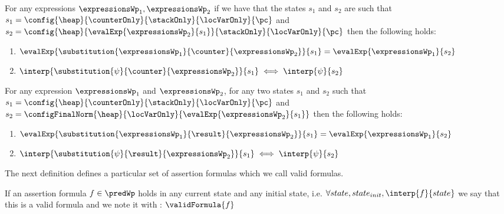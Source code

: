 \begin{substCntr}\label{substCntr}
For any expressions $ \expressionsWp_1, \expressionsWp_2 $ 
if we have that the states $s_1$ and $s_2$ are such that
 $s_1 =   \config{\heap}{\counterOnly}{ \stackOnly }{\locVarOnly}{\pc }$ and 
$s_2 =  \config{\heap}{\evalExp{ \expressionsWp_2}{ s_1  } }{ \stackOnly }{\locVarOnly}{\pc }  $ then 
the following holds:
\begin{enumerate}
      \item $\evalExp{\substitution{\expressionsWp_1}{ \counter }{ \expressionsWp_2 }}{ s_1 } = \evalExp{\expressionsWp_1}{s_2} $
      \item $\interp{\substitution{\psi}{ \counter }{ \expressionsWp_2 }}{ s_1 } \iff \interp{\psi}{s_2} $
\end{enumerate}
\end{substCntr} 




\begin{substRet}\label{substRet} 
For any expression $\expressionsWp_1$ and $\expressionsWp_2$,
for any two states $s_1$ and $s_2$  such that
$ s_1 =   \config{\heap}{\counterOnly}{ \stackOnly }{\locVarOnly}{\pc }$ and \\
$ s_2 =   \configFinalNorm{\heap}{\locVarOnly}{\evalExp{\expressionsWp_2}{s_1} } $ then 
the following holds:
\begin{enumerate}
      \item $\evalExp{\substitution{\expressionsWp_1}{ \result }{ \expressionsWp_2 }}{ s_1 } = \evalExp{\expressionsWp_1}{s_2} $
      \item $\interp{\substitution{\psi}{ \result}{ \expressionsWp_2 }}{ s_1 } \iff \interp{\psi}{s_2} $
\end{enumerate}
\end{substRet}


The next definition defines a particular set of assertion formulas which we call valid formulas.
\begin{valid}
  If an assertion formula  $ f \in \predWp $ holds in any current state and any initial state, i.e.
$\forall state, state_{init}, \interp{f}{state} $ we say that this is a valid formula and we note it with :
  $\validFormula{f} $ 
\end{valid}




